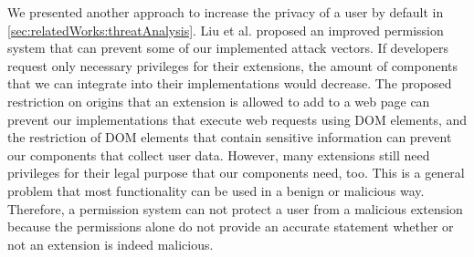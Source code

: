 	We presented another approach to increase the privacy of a user by default in \autoref{sec:relatedWorks:threatAnalysis}. Liu et al. proposed an improved permission system that can prevent some of our implemented attack vectors. If developers request only necessary privileges for their extensions, the amount of components that we can integrate into their implementations would decrease. The proposed restriction on origins that an extension is allowed to add to a web page can prevent our implementations that execute web requests using DOM elements, and the restriction of DOM elements that contain sensitive information can prevent our components that collect user data. However, many extensions still need privileges for their legal purpose that our components need, too. This is a general problem that most functionality can be used in a benign or malicious way. Therefore, a permission system can not protect a user from a malicious extension because the permissions alone do not provide an accurate statement whether or not an extension is indeed malicious. 

